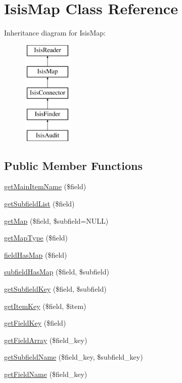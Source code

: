 \hypertarget{classIsisMap}{
\section{IsisMap Class Reference}
\label{classIsisMap}
}
Inheritance diagram for IsisMap:\begin{figure}[H]
\begin{center}
\leavevmode
\includegraphics[height=5cm]{classIsisMap}
\end{center}
\end{figure}
\subsection*{Public Member Functions}
\begin{DoxyCompactItemize}
\item 
\hyperlink{classIsisMap_af689f27e67b0b38a3e880ead17a487f5}{getMainItemName} (\$field)
\item 
\hyperlink{classIsisMap_ad0b61ec2fbfb011db4bf89c5f54efab4}{getSubfieldList} (\$field)
\item 
\hyperlink{classIsisMap_a29eb2c45b51f95fdfb9ff7af770ca6ce}{getMap} (\$field, \$subfield=NULL)
\item 
\hyperlink{classIsisMap_a62b933be483fb6704e12e41f10286cd5}{getMapType} (\$field)
\item 
\hyperlink{classIsisMap_af94e1fc5d73a6272f04a60c0acaeb409}{fieldHasMap} (\$field)
\item 
\hyperlink{classIsisMap_ab5493af644e529c11a3c3e6edc37c3b9}{subfieldHasMap} (\$field, \$subfield)
\item 
\hyperlink{classIsisMap_ae5d904b8407b38751656715fb9efd7cf}{getSubfieldKey} (\$field, \$subfield)
\item 
\hyperlink{classIsisMap_a994934784caa4149737bda55160a459f}{getItemKey} (\$field, \$item)
\item 
\hyperlink{classIsisMap_ac6a4eed048ddfa62c76e6d813754af81}{getFieldKey} (\$field)
\item 
\hyperlink{classIsisMap_aee1953b6e46b1612c725b2da82414d14}{getFieldArray} (\$field\_\-key)
\item 
\hyperlink{classIsisMap_a83ffdd84c385513a09e5ab523a44d6f2}{getSubfieldName} (\$field\_\-key, \$subfield\_\-key)
\item 
\hyperlink{classIsisMap_ae41313537e399f15ff16a4db887cf5b9}{getFieldName} (\$field\_\-key)
\end{DoxyCompactItemize}
